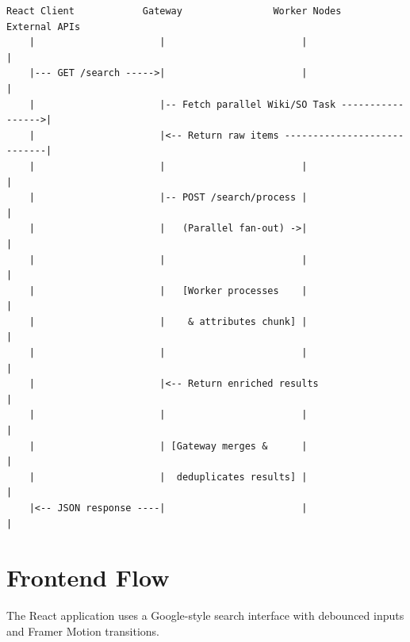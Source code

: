 \documentclass[11pt,a4paper]{article}
\begin{document}
\begin{verbatim}
React Client            Gateway                Worker Nodes            External APIs
    |                      |                        |                        |
    |--- GET /search ----->|                        |                        |
    |                      |-- Fetch parallel Wiki/SO Task ----------------->|
    |                      |<-- Return raw items ----------------------------|
    |                      |                        |                        |
    |                      |-- POST /search/process |                        |
    |                      |   (Parallel fan-out) ->|                        |
    |                      |                        |                        |
    |                      |   [Worker processes    |                        |
    |                      |    & attributes chunk] |                        |
    |                      |                        |                        |
    |                      |<-- Return enriched results                      |
    |                      |                        |                        |
    |                      | [Gateway merges &      |                        |
    |                      |  deduplicates results] |                        |
    |<-- JSON response ----|                        |                        |
\end{verbatim}

\newpage

\section{Frontend Flow}

The React application uses a Google-style search interface with debounced inputs and Framer Motion transitions.
\end{document}
